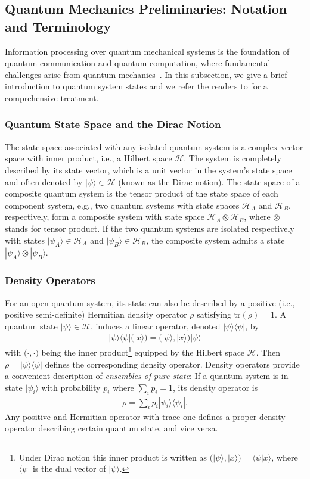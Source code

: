 \documentclass[a4paper, 11pt]{article}
\begin{document}
{
\subsection{Quantum Mechanics Preliminaries:  Notation and Terminology }
Information processing over quantum mechanical systems is the foundation of quantum communication and quantum computation, where fundamental challenges arise from quantum mechanics~\cite{Nielsen}. In this subsection, we give a brief introduction to quantum system states and we refer the readers  to \cite{Nielsen} for a comprehensive treatment.


\subsubsection{Quantum State Space and the Dirac Notion}
  The state space associated with any isolated quantum system is a complex vector space with inner product, {i.e.}, a Hilbert space $\mathcal{H}$. The system is completely described by its state vector, which is a unit vector in the system's state space and often denoted by $|\psi\rangle\in\mathcal{H}$  (known as the Dirac notion). The state space of a composite quantum system is the tensor product of the state space of each component system, e.g., two quantum systems with state spaces $\mathcal{H}_A$ and $\mathcal{H}_B$, respectively, form a composite system with state space $\mathcal{H}_A \otimes \mathcal{H}_B$, where $\otimes$ stands for tensor product. If the two quantum systems are isolated respectively with states  $|\psi_A\rangle\in\mathcal{H}_A$ and $|\psi_B\rangle\in\mathcal{H}_B$, the composite system admits a state $|\psi_A\rangle\otimes |\psi_B\rangle$.

\subsubsection{Density Operators}
For an open quantum system, its state can also be described by a positive (i.e., positive semi-definite) Hermitian density operator  $\rho$ satisfying $\text{tr}(\rho)=1$. A quantum state $|\psi\rangle\in\mathcal{H}$, induces a linear operator, denoted $|\psi\rangle\langle\psi |$, by
\begin{align*}
  |\psi\rangle\langle\psi | \Big(|x\rangle\Big)=  \Big(|\psi \rangle, |x\rangle\Big)  |\psi\rangle
  \end{align*}
  with $\Big(\cdot,\cdot\Big)$ being the inner product\footnote{Under Dirac notion this inner product is written as $\Big(|\psi \rangle, |x\rangle\Big)=\langle\psi |x\rangle$, where $\langle\psi |$ is the dual vector of $|\psi \rangle$.} equipped by the Hilbert space $\mathcal{H}$. Then $\rho=|\psi\rangle\langle\psi |$ defines the corresponding density operator. Density operators provide a convenient description of {\it ensembles of pure state}: If a quantum system is in state $|\psi_i \rangle$ with probability $p_i$ where $\sum_i p_i=1$, its density operator is
  \begin{align*}
  \rho=\sum_i p_i   |\psi_i\rangle\langle\psi_i |.
  \end{align*}
Any  positive and Hermitian operator  with trace one defines a proper density operator describing certain quantum state, and vice versa.


}
\end{document}
